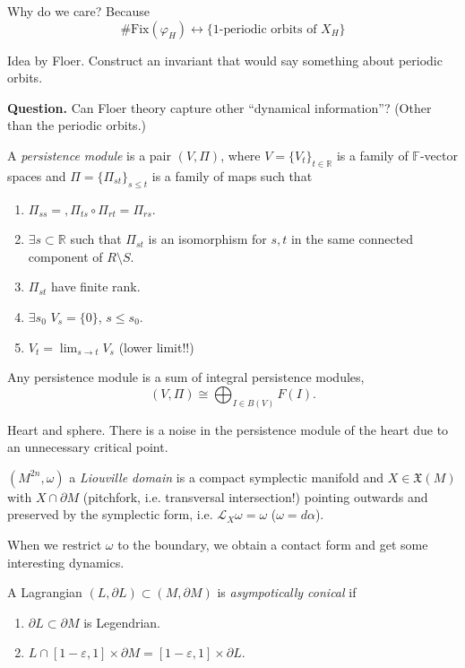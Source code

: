 Why do we care? Because
$$
\# \text{Fix}(\varphi_H)\leftrightarrow\{\text{1-periodic 
orbits of $X_H$}\}
$$

Idea by Floer. Construct an invariant that would 
say something about periodic orbits.

\medskip\noindent
{\bf Question.} Can Floer theory capture other ``dynamical information''? 
(Other than the periodic orbits.)

\medskip\noindent
A {\it persistence module} is a pair $(V,\Pi)$, where $V=\{V_t\}_{t \in
\mathbb{R}}$ is a family of $\mathbb{F}$-vector spaces
and $\Pi=\{\Pi_{st}\}_{s \leq  t}$ is a family of maps such that
\begin{enumerate}
\item $\Pi_{ss}=, \Pi_{ts}\circ \Pi_{rt}=\Pi_{rs}$.
\item $\exists  s \subset \mathbb{R}$ such that
$\Pi_{s t}$ is an isomorphism for $s,t$ in the same connected component of
$R\setminus S$.
\item $\Pi_{s t}$ have finite rank.
\item $\exists s_0$ $V_s=\{0\}$, $s \leq s_0$.
\item $V_t= \lim_{s \to t} V_s$ (lower limit!!)
\end{enumerate}

\begin{theorem}
\label{theorem-persistence-module-is-sum-of-integral}
Any persistence module is a sum of integral persistence modules,
$$
(V,\Pi) \cong \bigoplus_{I \in B(V)}F(I).
$$
\end{theorem}

\begin{example}
\label{example-hart-and-sphere}
Heart and sphere. There is a noise in the persistence module
of the heart due to an unnecessary critical point.
\end{example}

$(M^{2n},\omega)$ a {\it Liouville domain} is a compact
symplectic manifold and $X \in \mathfrak{X}(M)$ 
with $X \cap\partial M$ (pitchfork, i.e. transversal intersection!)
pointing outwards
and preserved by the symplectic form, i.e. $\mathcal{L}_X \omega=\omega$
($\omega=d \alpha$).

When we restrict $\omega$ to the boundary,
we obtain a contact form and get some
interesting dynamics.

A Lagrangian $(L,\partial L) \subset (M,\partial M)$ 
is {\it asympotically conical} if
\begin{enumerate}
\item $\partial L \subset \partial M$ is Legendrian.
\item $L \cap [1-\varepsilon,1] \times \partial M=
[1-\varepsilon,1] \times \partial L$.
\end{enumerate}

